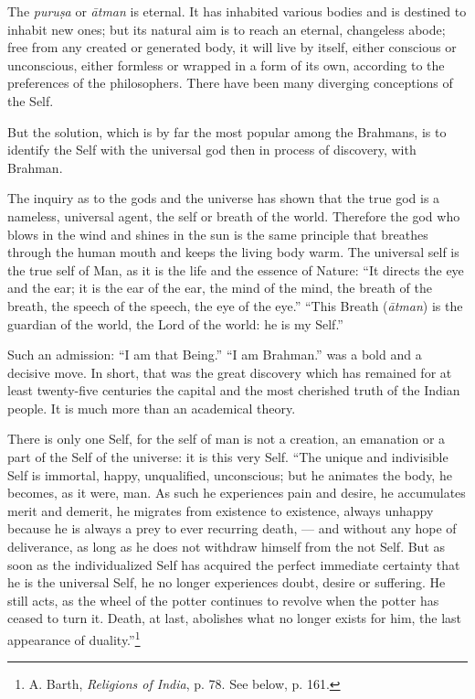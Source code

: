 \documentclass[a4paper, 11pt, oneside, english]{article}
\begin{document}
The \emph{puruṣa} or \emph{ātman} is eternal. It has inhabited various bodies and is destined to inhabit new ones; but its natural aim is to reach an eternal, changeless abode; free from any created or generated body, it will live by itself, either conscious or unconscious, either formless or wrapped in a form of its own, according to the preferences of the philosophers. There have been many diverging conceptions of the Self.

But the solution, which is by far the most popular among the Brahmans, is to identify the Self with the universal god then in process of discovery, with Brahman.

The inquiry as to the gods and the universe has shown that the true god is a nameless, universal agent, the self or breath of the world. Therefore the god who blows in the wind and shines in the sun is the same principle that breathes through the human mouth and keeps the living body warm. The universal self is the true self of Man, as it is the life and the essence of Nature: ``It directs the eye and the ear; it is the ear of the ear, the mind of the mind, the breath of the breath, the speech of the speech, the eye of the eye.'' ``This Breath (\emph{ātman}) is the guardian of the world, the Lord of the world: he is my Self.''

Such an admission: ``I am that Being.'' ``I am Brahman.'' was a bold and a decisive move. In short, that was the great discovery which has remained for at least twenty-five centuries the capital and the most cherished truth of the Indian people. It is much more than an academical theory.

There is only one Self, for the self of man is not a creation, an emanation or a part of the Self of the universe: it is this very Self. ``The unique and indivisible Self is immortal, happy, unqualified, unconscious; but he animates the body, he becomes, as it were, man. As such he experiences pain and desire, he accumulates merit and demerit, he migrates from existence to existence, always unhappy because he is always a prey to ever recurring death, --- and without any hope of deliverance, as long as he does not withdraw himself from the not Self. But as soon as the individualized Self has acquired the perfect immediate certainty that he is the universal Self, he no longer experiences doubt, desire or suffering. He still acts, as the wheel of the potter continues to revolve when the potter has ceased to turn it. Death, at last, abolishes what no longer exists for him, the last appearance of duality.''\footnote{A. Barth, \emph{Religions of India}, p. 78. See below, p. 161.}
\end{document}
